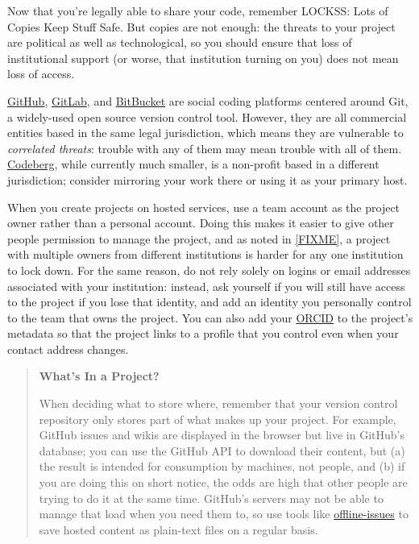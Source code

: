 \documentclass[10pt,letterpaper]{article}
\begin{document}
Now that you're legally able to share your code, remember LOCKSS: Lots of Copies Keep Stuff Safe.
But copies are not enough:
the threats to your project are political as well as technological,
so you should ensure that loss of institutional support
(or worse, that institution turning on you)
does not mean loss of access.

\href{https://github.com/}{GitHub},
\href{https://gitlab.com}{GitLab},
and \href{https://bitbucket.org/}{BitBucket}
are social coding platforms centered around Git,
a widely-used open source version control tool.
However,
they are all commercial entities based in the same legal jurisdiction,
which means they are vulnerable to \emph{correlated threats}:
trouble with any of them may mean trouble with all of them.
\href{https://codeberg.org/}{Codeberg},
while currently much smaller,
is a non-profit based in a different jurisdiction;
consider mirroring your work there or using it as your primary host.

When you create projects on hosted services,
use a team account as the project owner rather than a personal account.
Doing this makes it easier to give other people permission to manage the project,
and as noted in \ref{FIXME},
a project with multiple owners from different institutions
is harder for any one institution to lock down.
For the same reason,
do not rely solely on logins or email addresses associated with your institution:
instead,
ask yourself if you will still have access to the project if you lose that identity,
and add an identity you personally control to the team that owns the project.
You can also add your \href{https://orcid.org/}{ORCID} to the project's metadata
so that the project links to a profile that you control
even when your contact address changes.

\begin{quote}
  \noindent
  \textbf{What's In a Project?}

  When deciding what to store where,
  remember that your version control repository only stores part of what makes up your project.
  For example,
  GitHub issues and wikis are displayed in the browser but live in GitHub's database;
  you can use the GitHub API to download their content,
  but (a) the result is intended for consumption by machines, not people,
  and (b) if you are doing this on short notice,
  the odds are high that other people are trying to do it at the same time.
  GitHub's servers may not be able to manage that load when you need them to,
  so use tools like \href{https://github.com/jlord/offline-issues}{offline-issues}
  to save hosted content as plain-text files on a regular basis.
\end{quote}
\end{document}
